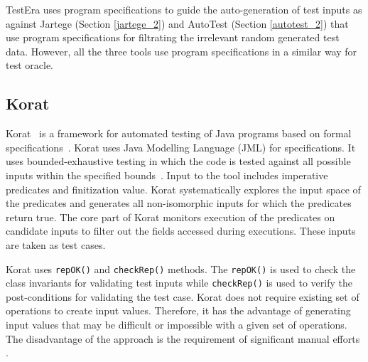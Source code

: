 TestEra uses program specifications to guide the auto-generation of test inputs as against Jartege (Section \ref{jartege_2}) and AutoTest (Section \ref{autotest_2}) that use program specifications for filtrating the irrelevant random generated test data. However, all the three tools use program specifications in a similar way for test oracle. 



\subsection{Korat} %
Korat~\cite{boyapati2002korat} is a framework for automated testing of Java programs based on formal specifications~\cite{chang1999structural}. %
Korat uses Java Modelling Language (JML) for specifications. It uses bounded-exhaustive testing in which the code is tested against all possible inputs within the specified bounds~\cite{khurshid2001checking}. %
Input to the tool includes imperative predicates and finitization value. Korat systematically explores the input space of the predicates and generates all non-isomorphic inputs for which the predicates return true. The core part of Korat monitors execution of the predicates on candidate inputs to filter out the fields accessed during executions. These inputs are taken as test cases. 

Korat uses \verb+repOK()+ and \verb+checkRep()+ methods. The \verb+repOK()+ is used to check the class invariants for validating test inputs while \verb+checkRep()+ is used to verify the post-conditions for validating the test case. Korat does not require existing set of operations to create input values. Therefore, it has the advantage of generating input values that may be difficult or impossible with a given set of operations. The disadvantage of the approach is the requirement of significant manual efforts \cite{pacheco2009directed}.    

